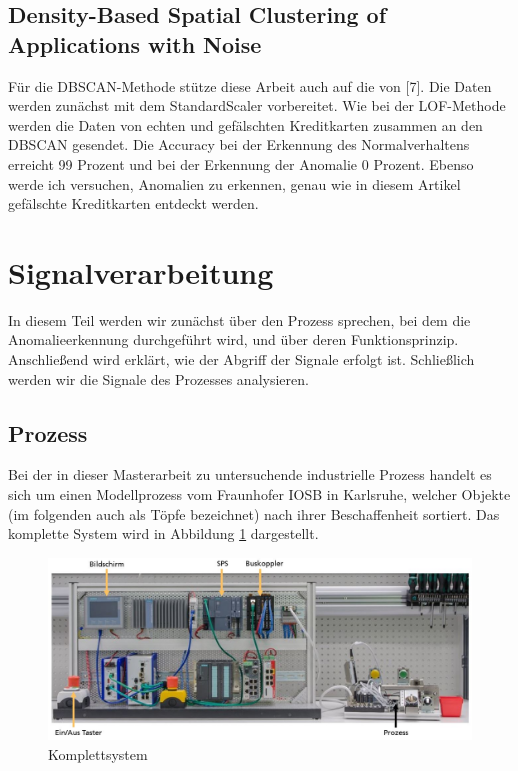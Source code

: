 \documentclass[12pt,a4paper]{scrartcl}
\numberwithin{equation}{section}
\begin{document}
\subsection{Density-Based Spatial Clustering of Applications with Noise}

Für die DBSCAN-Methode stütze diese Arbeit auch auf die von [7]. Die Daten werden zunächst mit dem StandardScaler vorbereitet. Wie bei der LOF-Methode werden die Daten von echten und gefälschten Kreditkarten zusammen an den DBSCAN gesendet. Die Accuracy bei der Erkennung des Normalverhaltens erreicht 99 Prozent und bei der Erkennung der Anomalie 0 Prozent. Ebenso werde ich versuchen, Anomalien zu erkennen, genau wie in diesem Artikel gefälschte Kreditkarten entdeckt werden. 

 \newpage  %
\section{Signalverarbeitung}

In diesem Teil werden wir zunächst über den Prozess sprechen, bei dem die Anomalieerkennung durchgeführt wird, und über deren Funktionsprinzip. Anschließend wird erklärt, wie der Abgriff der Signale erfolgt ist. Schließlich werden wir die Signale des Prozesses analysieren. 

\subsection{Prozess}

Bei der in dieser Masterarbeit zu untersuchende industrielle Prozess handelt es sich um einen Modellprozess vom Fraunhofer IOSB in Karlsruhe, welcher Objekte (im folgenden auch als Töpfe bezeichnet) nach ihrer Beschaffenheit sortiert. Das komplette System wird in Abbildung \ref{ganze_prozess} dargestellt.

\begin{figure}[h]
	\centering
	  \includegraphics[scale=0.5]{ganze_prozess.jpg}
	  \caption{Komplettsystem}
	\label{ganze_prozess}
\end{figure}
\end{document}
